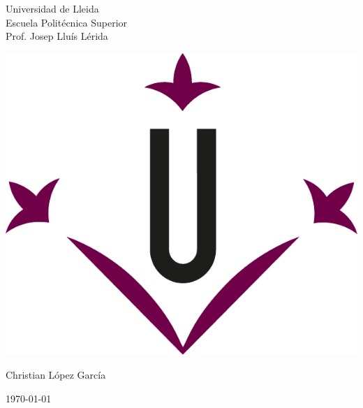 \documentclass[../main.tex]{subfiles}
\begin{document}
\begin{titlepage}
    \begin{minipage}[c]{0.4\linewidth}
    Universidad de Lleida\\
    Escuela Politécnica Superior\\
    Prof. Josep Lluís Lérida\\
    \end{minipage}
    \hfill
    \begin{minipage}[c]{0.5\linewidth}
    \hfill
    \includegraphics[width=0.5\linewidth]{media/figures/udl_logo.pdf}
    \end{minipage}
        
    \vspace{5cm}

            
    \vspace{5cm}
        
    \begin{flushright}
        \large
        Christian López García
    \end{flushright}
        
    \vfill
        
    \begin{center}
        \today
    \end{center}
\end{titlepage}
\end{document}
